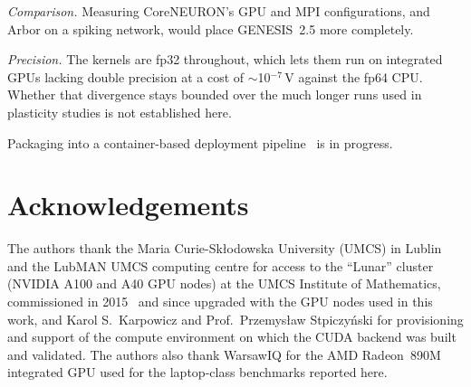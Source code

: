 \documentclass[preprint,12pt, a4paper]{elsarticle}
\begin{document}
\begin{enumerate}
\emph{Comparison.} Measuring CoreNEURON's GPU and MPI configurations, and Arbor on a spiking network, would place GENESIS~2.5 more completely.

\emph{Precision.} The kernels are fp32 throughout, which lets them run on integrated GPUs lacking double precision at a cost of $\sim$10$^{-7}$\,V against the fp64 CPU. Whether that divergence stays bounded over the much longer runs used in plasticity studies is not established here.

Packaging into a container-based deployment pipeline~\cite{chlasta2023pipeline} is in progress.

\end{enumerate}

\section*{Acknowledgements}
\label{}

The authors thank the Maria Curie-Sk\l{}odowska University (UMCS) in Lublin and
the LubMAN UMCS computing centre for access to the ``Lunar'' cluster (NVIDIA A100
and A40 GPU nodes) at the UMCS Institute of Mathematics, commissioned in
2015~\cite{umcs_lunar2015} and since upgraded with the GPU nodes used in this
work, and Karol S.~Karpowicz and Prof.~Przemys\l{}aw Stpiczy\'nski
for provisioning and support of the compute environment on which the CUDA backend
was built and validated. The authors also thank WarsawIQ for the AMD Radeon~890M
integrated GPU used for the laptop-class benchmarks reported here.




\end{document}
